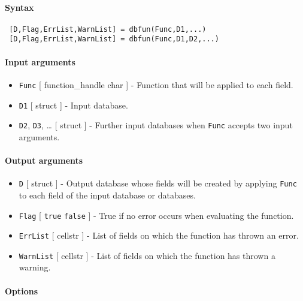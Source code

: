 


	\paragraph{Syntax}
 
 \begin{verbatim}
 [D,Flag,ErrList,WarnList] = dbfun(Func,D1,...)
 [D,Flag,ErrList,WarnList] = dbfun(Func,D1,D2,...)
 \end{verbatim}
 
 \paragraph{Input arguments}
 
 \begin{itemize}
 \item
   \texttt{Func} {[} function\_handle \textbar{} char {]} - Function that
   will be applied to each field.
 \item
   \texttt{D1} {[} struct {]} - Input database.
 \item
   \texttt{D2}, \texttt{D3}, \ldots{} {[} struct {]} - Further input
   databases when \texttt{Func} accepts two input arguments.
 \end{itemize}
 
 \paragraph{Output arguments}
 
 \begin{itemize}
 \item
   \texttt{D} {[} struct {]} - Output database whose fields will be
   created by applying \texttt{Func} to each field of the input database
   or databases.
 \item
   \texttt{Flag} {[} \texttt{true} \textbar{} \texttt{false} {]} - True
   if no error occurs when evaluating the function.
 \item
   \texttt{ErrList} {[} cellstr {]} - List of fields on which the
   function has thrown an error.
 \item
   \texttt{WarnList} {[} cellstr {]} - List of fields on which the
   function has thrown a warning.
 \end{itemize}
 
 \paragraph{Options}
 
